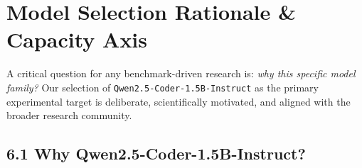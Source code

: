 \documentclass[12pt, a4paper]{article}
\begin{document}
\section{Model Selection Rationale \& Capacity Axis}

A critical question for any benchmark-driven research is: \emph{why this specific model family?} Our selection of \texttt{Qwen2.5-Coder-1.5B-Instruct} as the primary experimental target is deliberate, scientifically motivated, and aligned with the broader research community.

\subsection{6.1 Why Qwen2.5-Coder-1.5B-Instruct?}
\end{document}
